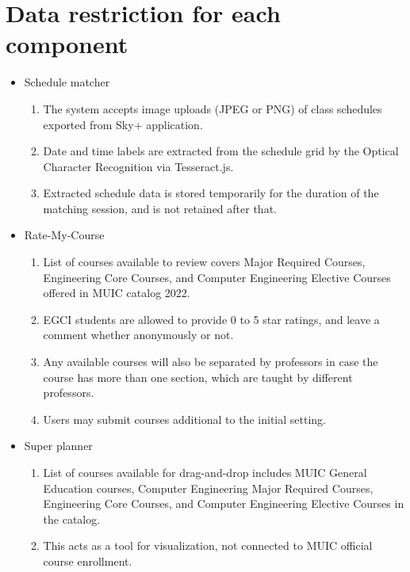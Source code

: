 \section{Data restriction for each component}
\begin{itemize}
	\item Schedule matcher
	\begin{enumerate}[label=\alph*.]
		\item The system accepts image uploads (JPEG or PNG) of class schedules exported from Sky+  application.
		\item Date and time labels are extracted from the schedule grid by the Optical Character Recognition via Tesseract.js.
		\item Extracted schedule data is stored temporarily for the duration of the matching session, and is not retained after that.
	\end{enumerate}
	\item Rate-My-Course
	\begin{enumerate}[label=\alph*.]
		\item List of courses available to review covers Major Required Courses, Engineering Core Courses, and Computer Engineering Elective Courses offered in MUIC catalog 2022.
		\item EGCI students are allowed to provide 0 to 5 star ratings, and  leave a comment whether anonymously or not.
		\item Any available courses will also be separated by professors in case the course has more than one section, which are taught by different professors.
		\item Users may submit courses additional to the initial setting.
	\end{enumerate}
	\item Super planner
	\begin{enumerate}[label=\alph*.]
		\item List of courses available for drag-and-drop includes MUIC General Education courses, Computer Engineering Major Required Courses, Engineering Core Courses, and Computer Engineering Elective Courses in the catalog.
		\item This acts as a tool for visualization, not connected to MUIC official course enrollment.
	\end{enumerate}
	
\end{itemize}

